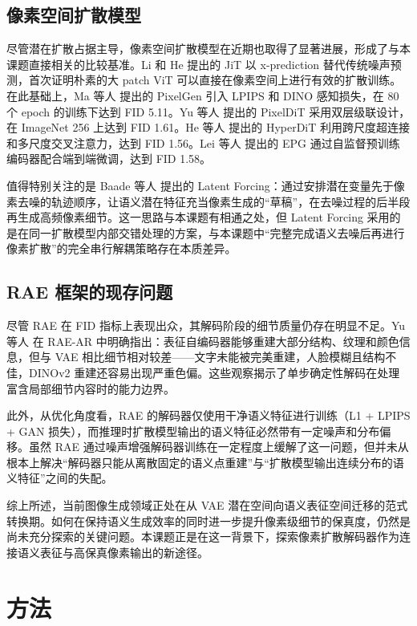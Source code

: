 \documentclass[11pt]{article}
\begin{document}
\subsection{像素空间扩散模型}

尽管潜在扩散占据主导，像素空间扩散模型在近期也取得了显著进展，形成了与本课题直接相关的比较基准。Li 和 He\cite{jit} 提出的 JiT 以 x-prediction 替代传统噪声预测，首次证明朴素的大 patch ViT 可以直接在像素空间上进行有效的扩散训练。在此基础上，Ma 等人\cite{pixelgen} 提出的 PixelGen 引入 LPIPS\cite{lpips} 和 DINO 感知损失，在 80 个 epoch 的训练下达到 FID 5.11。Yu 等人\cite{pixeldit} 提出的 PixelDiT 采用双层级联设计，在 ImageNet 256 上达到 FID 1.61。He 等人\cite{hyperdit} 提出的 HyperDiT 利用跨尺度超连接和多尺度交叉注意力，达到 FID 1.56。Lei 等人\cite{epg} 提出的 EPG 通过自监督预训练编码器配合端到端微调，达到 FID 1.58。

值得特别关注的是 Baade 等人\cite{latent-forcing} 提出的 Latent Forcing：通过安排潜在变量先于像素去噪的轨迹顺序，让语义潜在特征充当像素生成的“草稿”，在去噪过程的后半段再生成高频像素细节。这一思路与本课题有相通之处，但 Latent Forcing 采用的是在同一扩散模型内部交错处理的方案，与本课题中“完整完成语义去噪后再进行像素扩散”的完全串行解耦策略存在本质差异。

\subsection{RAE 框架的现存问题}

尽管 RAE 在 FID 指标上表现出众，其解码阶段的细节质量仍存在明显不足。Yu 等人\cite{rae-ar} 在 RAE-AR 中明确指出：表征自编码器能够重建大部分结构、纹理和颜色信息，但与 VAE 相比细节相对较差——文字未能被完美重建，人脸模糊且结构不佳，DINOv2 重建还容易出现严重色偏。这些观察揭示了单步确定性解码在处理富含局部细节内容时的能力边界。

此外，从优化角度看，RAE 的解码器仅使用干净语义特征进行训练（L1 + LPIPS + GAN 损失），而推理时扩散模型输出的语义特征必然带有一定噪声和分布偏移。虽然 RAE 通过噪声增强解码器训练在一定程度上缓解了这一问题，但并未从根本上解决“解码器只能从离散固定的语义点重建”与“扩散模型输出连续分布的语义特征”之间的失配。

综上所述，当前图像生成领域正处在从 VAE 潜在空间向语义表征空间迁移的范式转换期。如何在保持语义生成效率的同时进一步提升像素级细节的保真度，仍然是尚未充分探索的关键问题。本课题正是在这一背景下，探索像素扩散解码器作为连接语义表征与高保真像素输出的新途径。

\section{方法}
\end{document}
